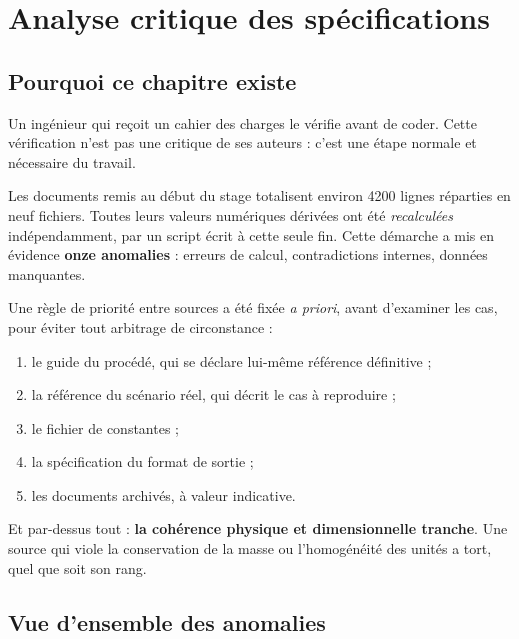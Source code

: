 \chapter{Analyse critique des spécifications}
\label{chap:analyse-specs}

\section{Pourquoi ce chapitre existe}

Un ingénieur qui reçoit un cahier des charges le vérifie avant de coder. Cette vérification
n'est pas une critique de ses auteurs : c'est une étape normale et nécessaire du travail.

Les documents remis au début du stage totalisent environ \num{4200} lignes réparties en neuf
fichiers. Toutes leurs valeurs numériques dérivées ont été \emph{recalculées} indépendamment,
par un script écrit à cette seule fin. Cette démarche a mis en évidence
\textbf{onze anomalies} : erreurs de calcul, contradictions internes, données manquantes.

\begin{encadre}[title={Méthode adoptée face à une contradiction}]
Une règle de priorité entre sources a été fixée \emph{a priori}, avant d'examiner les cas,
pour éviter tout arbitrage de circonstance :

\begin{enumerate}
  \item le guide du procédé, qui se déclare lui-même référence définitive ;
  \item la référence du scénario réel, qui décrit le cas à reproduire ;
  \item le fichier de constantes ;
  \item la spécification du format de sortie ;
  \item les documents archivés, à valeur indicative.
\end{enumerate}

Et par-dessus tout : \textbf{la cohérence physique et dimensionnelle tranche}. Une source
qui viole la conservation de la masse ou l'homogénéité des unités a tort, quel que soit son
rang.
\end{encadre}

\section{Vue d'ensemble des anomalies}

